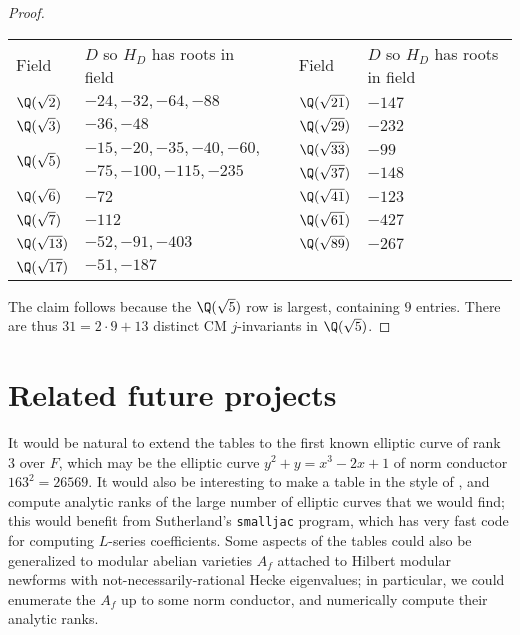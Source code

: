 \documentclass{amsart}
\begin{document}
\begin{proof}
\begin{center}
\begin{tabular}{@{}llcll@{}}\toprule
Field & $D$ so $H_D$ has roots in field & \phantom{ab} & Field & $D$ so $H_D$ has roots in field \\\cmidrule{1-2}\cmidrule{4-5}
$\Q(\sqrt{2})$ & $-24,-32,-64,-88$ & & $\Q(\sqrt{21})$ & $-147$ \\
$\Q(\sqrt{3})$ & $-36,-48$ & & $\Q(\sqrt{29})$ & $-232$ \\
\multirow{2}{*}{$\Q(\sqrt{5})$} & $-15,-20,-35,-40,-60,$ & & $\Q(\sqrt{33})$ & $-99$ \\
      & $-75,-100,-115,-235$ & & $\Q(\sqrt{37})$ & $-148$ \\
$\Q(\sqrt{6})$ & $-72$ & & $\Q(\sqrt{41})$ & $-123$ \\
$\Q(\sqrt{7})$ & $-112$ & & $\Q(\sqrt{61})$ & $-427$ \\
$\Q(\sqrt{13})$ & $-52,-91,-403$ & & $\Q(\sqrt{89})$ & $-267$ \\
$\Q(\sqrt{17})$ & $-51,-187$ & & & \\\bottomrule
\end{tabular}
\end{center}
The claim follows because the $\Q(\sqrt{5})$ row is largest,
containing $9$ entries.  There are thus $31 = 2\cdot 9 + 13$ distinct CM $j$-invariants
in $\Q(\sqrt{5})$.

\end{proof}

\section{Related future projects}\label{sec:future}

It would be natural to extend the tables to the first known elliptic curve of
rank $3$ over $F$, which may be the elliptic curve $y^2 + y = x^3 -2x + 1$ of
norm conductor $163^2=26569$.  It would also be interesting to make a
table in the style of \cite{stein-watkins:ants5}, and compute analytic
ranks of the large number of elliptic curves that we would find; this would
benefit from Sutherland's {\tt smalljac} program, which has very fast code
for computing $L$-series coefficients.  Some aspects of the tables
could also be generalized to modular abelian varieties $A_f$ attached
to Hilbert modular newforms with not-necessarily-rational Hecke
eigenvalues; in particular, we could enumerate the $A_f$ up to some
norm conductor, and numerically compute their analytic ranks.
\end{document}
